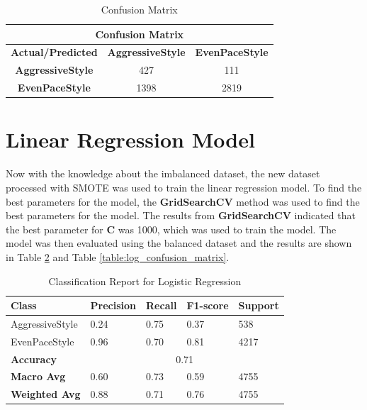 \begin{table}[H]
    \centering
    \begin{tabular}{|c|c|c|}
    \hline
    \multicolumn{3}{|c|}{\textbf{Confusion Matrix}} \\
    \hline
    \textbf{Actual/Predicted} & \textbf{AggressiveStyle} & \textbf{EvenPaceStyle} \\ \hline
    \textbf{AggressiveStyle} & 427 & 111 \\ \hline
    \textbf{EvenPaceStyle} & 1398 & 2819 \\ \hline
    \end{tabular}
    \caption{Confusion Matrix}
    \label{table:confusion_matrix_smote}
\end{table}

\section{Linear Regression Model}
Now with the knowledge about the imbalanced dataset, the new dataset processed with SMOTE was used to train the linear regression model. To find the best parameters for the model,
the \textbf{GridSearchCV} method was used to find the best parameters for the model. The results from \textbf{GridSearchCV} indicated that the best parameter for \textbf{C} was 1000,
which was used to train the model. The model was then evaluated using the balanced dataset and the results are shown in Table \ref{table:log_classification_report} 
and Table \ref{table:log_confusion_matrix}.


\begin{table}[H]
    \centering    
    \begin{tabular}{|l|l|l|l|l|}
    \hline
    \textbf{Class} & \textbf{Precision} & \textbf{Recall} & \textbf{F1-score} & \textbf{Support} \\ \hline
    AggressiveStyle & 0.24 & 0.75 & 0.37 & 538 \\ \hline
    EvenPaceStyle & 0.96 & 0.70 & 0.81 & 4217 \\ \hline
    \textbf{Accuracy} & \multicolumn{4}{c|}{0.71} \\ \hline
    \textbf{Macro Avg} & 0.60 & 0.73 & 0.59 & 4755 \\ \hline
    \textbf{Weighted Avg} & 0.88 & 0.71 & 0.76 & 4755 \\ \hline
    \end{tabular}
    \caption{Classification Report for Logistic Regression}
    \label{table:log_classification_report}
\end{table}

